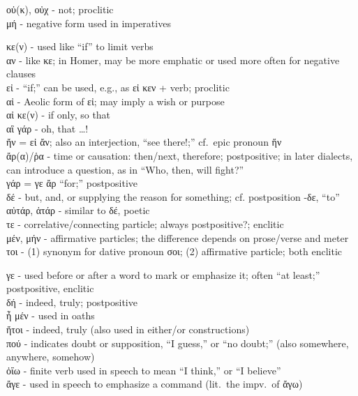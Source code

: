 \begin{small}

οὐ(κ), οὐχ - not; proclitic\\
μή - negative form used in imperatives\\



κε(ν) - used like ``if'' to limit verbs\\
αν - like κε; in Homer, may be more emphatic or used more often for negative clauses\\
εἰ - ``if;'' can be used, e.g., as εἰ κεν + verb; proclitic\\
αἰ - Aeolic form of εἰ; may imply a wish or purpose\\
αἰ κε(ν) - if only, so that\\
αἲ γάρ - oh, that \ldots !\\
ἤν = εἰ ἄν; also an interjection, ``see there!;'' cf.~epic pronoun ἥν\\
ἄρ(α)/ῥα - time or causation: then/next, therefore; postpositive; in later dialects, can introduce
      a question, as in ``Who, then, will fight?''\\
γάρ = γε ἄρ ``for;'' postpositive\\
δέ - but, and, or supplying the reason for something; cf. postposition -δε, ``to''\\
αὐτάρ, ἀτάρ - similar to δέ, poetic\\
τε - correlative/connecting particle; always postpositive?; enclitic\\
μέν, μήν - affirmative particles; the difference depends on prose/verse and meter\\
τοι - (1) synonym for dative pronoun σοι; (2) affirmative particle; both enclitic\\


γε - used before or after a word to mark or emphasize it; often ``at least;'' postpositive, enclitic\\
δή - indeed, truly; postpositive\\
ἦ μέν - used in oaths\\
ἤτοι - indeed, truly (also used in either/or constructions)\\
πού - indicates doubt or supposition, ``I guess,'' or ``no doubt;'' (also somewhere, anywhere, somehow)\\
ὀΐω - finite verb used in speech to mean ``I think,'' or ``I believe''\\
ἄγε - used in speech to emphasize a command (lit.~the impv.~of ἄγω)


\end{small}
